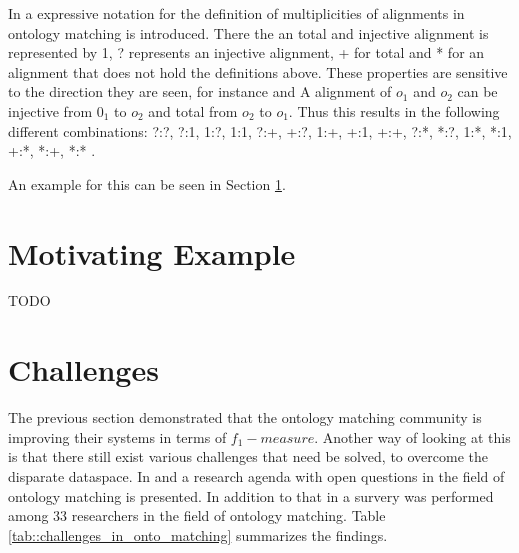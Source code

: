 \documentclass[11pt,titlepage,oneside,openany,a4paper]{report}
\begin{document}
In \cite{euzenat2003towards} a expressive notation for the definition of multiplicities of alignments in ontology matching is introduced. There the an total and injective alignment is represented by 1, ? represents an injective alignment, + for total and * for an alignment that does not hold the definitions above. These properties are sensitive to the direction they are seen, for instance and A alignment of $o_1$ and $o_2$ can be injective from $0_1$ to $o_2$ and total from $o_2$ to $o_1$. Thus this results in the following different combinations: ?:?, ?:1, 1:?, 1:1, ?:+, +:?, 1:+, +:1, +:+, ?:*, *:?, 1:*, *:1, +:*, *:+, *:* .

An example for this can be seen in Section \ref{sec:motivating_example}.
\section{Motivating Example}
\label{sec:motivating_example}
TODO

\section{Challenges}
\label{sec:challeng_ontology_matching}
The previous section demonstrated that the ontology matching community is improving their systems in terms of $f_1-measure$. Another way of looking at this is that there still exist various challenges that need be solved, to overcome the disparate dataspace. In \cite{6104044} and  \cite{euzenat2013d} a research agenda with open questions in the field of ontology matching is presented. In addition to that in \cite{OteroCerdeira2015949} a survery was performed among 33 researchers in the field of ontology matching. Table \ref{tab::challenges_in_onto_matching} summarizes the findings.
\end{document}
